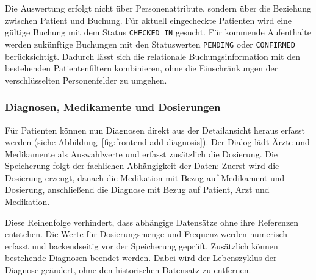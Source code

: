 Die Auswertung erfolgt nicht über Personenattribute, sondern über die Beziehung zwischen Patient und Buchung. Für aktuell eingecheckte Patienten wird eine gültige Buchung mit dem Status \texttt{CHECKED\_IN} gesucht. Für kommende Aufenthalte werden zukünftige Buchungen mit den Statuswerten \texttt{PENDING} oder \texttt{CONFIRMED} berücksichtigt. Dadurch lässt sich die relationale Buchungsinformation mit den bestehenden Patientenfiltern kombinieren, ohne die Einschränkungen der verschlüsselten Personenfelder zu umgehen.

\subsubsection{Diagnosen, Medikamente und Dosierungen}

Für Patienten können nun Diagnosen direkt aus der Detailansicht heraus erfasst werden (siehe Abbildung~\ref{fig:frontend-add-diagnosis}). Der Dialog lädt Ärzte und Medikamente als Auswahlwerte und erfasst zusätzlich die Dosierung. Die Speicherung folgt der fachlichen Abhängigkeit der Daten: Zuerst wird die Dosierung erzeugt, danach die Medikation mit Bezug auf Medikament und Dosierung, anschließend die Diagnose mit Bezug auf Patient, Arzt und Medikation.

Diese Reihenfolge verhindert, dass abhängige Datensätze ohne ihre Referenzen entstehen. Die Werte für Dosierungsmenge und Frequenz werden numerisch erfasst und backendseitig vor der Speicherung geprüft. Zusätzlich können bestehende Diagnosen beendet werden. Dabei wird der Lebenszyklus der Diagnose geändert, ohne den historischen Datensatz zu entfernen.

